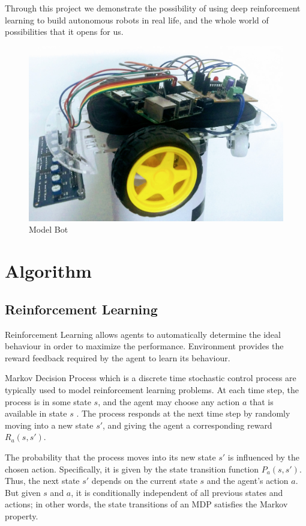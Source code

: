 \documentclass[12pt]{extreport}
\theoremstyle{plain}
\theoremstyle{definition}
\begin{document}
Through this project we demonstrate the possibility of using deep reinforcement learning to build autonomous robots in real life, and the whole world of possibilities that it opens for us.

\begin{figure}[b!]
    \includegraphics[width=\textwidth]{bot}
    \caption{Model Bot}
\end{figure}


\chapter{Algorithm}

\section{Reinforcement Learning}

Reinforcement Learning allows agents to automatically determine the ideal behaviour
 in order to maximize the performance. Environment provides the reward feedback
 required by the agent to learn its behaviour.

Markov Decision Process which is a discrete time stochastic control process are
typically used to model reinforcement learning problems. At each time step, the
process is in some state $ s $, and the agent may choose any action $ a $ that
is available in state $ s $ . The process responds at the next time step by
randomly moving into a new state $ s' $, and giving the agent a
corresponding reward $ R_{a}(s,s') $.

The probability that the process moves into its new state $ s' $ is
influenced by the chosen action. Specifically, it is given by the state transition
function $ P_{a}(s,s') $. Thus, the next state $ s' $
depends on the current state $ s $ and the agent's action $ a $.
But given $ s $ and $ a $, it is conditionally independent
of all previous states and actions; in other words, the state transitions of an
MDP satisfies the Markov property.
\end{document}
